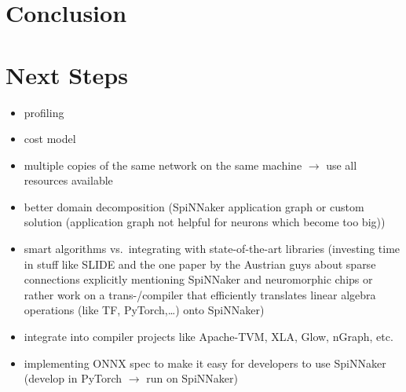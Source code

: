 \documentclass[]{article}
\begin{document}
\section{Conclusion}
\label{sec:conclusion}

\section{Next Steps}
\label{sec:next_steps}

\begin{itemize}
  \item profiling
  \item cost model
  \item multiple copies of the same network on the same machine
    $\rightarrow$ use all resources available
  \item better domain decomposition (SpiNNaker application graph or
    custom solution (application graph not helpful for neurons which
    become too big))
  \item smart algorithms vs.\ integrating with state-of-the-art libraries
    (investing time in stuff like SLIDE and the one paper by the Austrian
    guys about sparse connections explicitly mentioning SpiNNaker and
    neuromorphic chips or rather work on a trans-/compiler
    that efficiently translates linear algebra operations (like TF,
    PyTorch,\dots) onto SpiNNaker)
  \item integrate into compiler projects like Apache-TVM, XLA, Glow,
   nGraph, etc.
  \item implementing ONNX spec to make it easy for developers to use
    SpiNNaker (develop in PyTorch $\rightarrow$ run on SpiNNaker)
\end{itemize}


\end{document}
